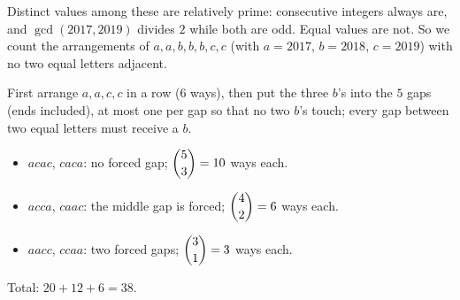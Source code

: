 Distinct values among these are relatively prime: consecutive integers always are, and $\gcd(2017,2019)$ divides $2$ while both are odd. Equal values are not. So we count the arrangements of $a,a,b,b,b,c,c$ (with $a=2017$, $b=2018$, $c=2019$) with no two equal letters adjacent.

First arrange $a,a,c,c$ in a row ($6$ ways), then put the three $b$'s into the $5$ gaps (ends included), at most one per gap so that no two $b$'s touch; every gap between two equal letters must receive a $b$.
\begin{itemize}
\item $acac$, $caca$: no forced gap; $\dbinom53=10$ ways each.
\item $acca$, $caac$: the middle gap is forced; $\dbinom42=6$ ways each.
\item $aacc$, $ccaa$: two forced gaps; $\dbinom31=3$ ways each.
\end{itemize}
Total: $20+12+6=\boxed{38}$.
